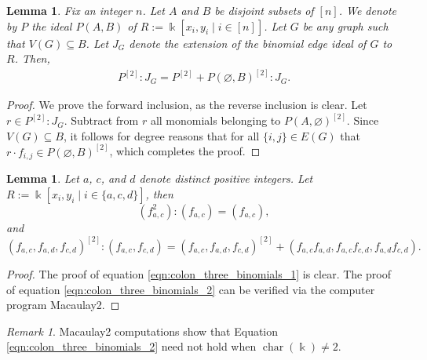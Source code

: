 \documentclass[12pt,a4paper]{amsart}
\theoremstyle{plain}
\newtheorem{lem}[thrm]{Lemma}
\def\blem{\begin{lem}}
\def\elem{\end{lem}}
\theoremstyle{definition}
\def\bproof{\begin{proof}}
\def\eproof{\end{proof}}
\theoremstyle{remark}
\newtheorem{rem}[thrm]{Remark}
\def\brem{\begin{rem}}
\def\erem{\end{rem}}
\def\k{\Bbbk}
\DeclareMathOperator{\fchar}{char}
\renewcommand{\subset}{\subseteq}
\begin{document}
\blem 
\label{lem:reduction_of_colon_computation}
Fix an integer $n$. Let $A$ and $B$ be disjoint subsets of $[n]$. We denote by $P$ the ideal $P(A,B)$ of $R := \k[x_{i},y_{i} \mid i \in [n]]$. Let $G$ be any graph such that $V(G) \subset B$. Let $J_{G}$ denote the extension of the binomial edge ideal of $G$ to $R$. Then,
\begin{align*}
    P^{[2]}:J_{G} = P^{[2]} + P(\varnothing,B)^{[2]}:J_{G}.
\end{align*}
\elem 

\bproof
We prove the forward inclusion, as the reverse inclusion is clear. Let $r \in P^{[2]}:J_{G}$. Subtract from $r$ all monomials belonging to $P(A,\varnothing)^{[2]}$. Since $V(G) \subset B$, it follows for degree reasons that for all $\{i,j\} \in E(G)$ that $r\cdot f_{i,j} \in P(\varnothing,B)^{[2]}$, which completes the proof.
\eproof

\blem
\label{lem:colon_three_binomials}
Let $a$, $c$, and $d$ denote distinct positive integers. Let $R := \k[x_{i},y_{i} \mid i \in \{a,c,d\}]$, then
\begin{equation}
    \label{eqn:colon_three_binomials_1}
    (f_{a,c}^{2}):(f_{a,c}) = (f_{a,c}),
\end{equation}
and 
\begin{equation}
    \label{eqn:colon_three_binomials_2}
    (f_{a,c},f_{a,d},f_{c,d})^{[2]} : (f_{a,c},f_{c,d}) = (f_{a,c},f_{a,d},f_{c,d})^{[2]} + (f_{a,c}f_{a,d}, f_{a,c}f_{c,d}, f_{a,d}f_{c,d}).
\end{equation}
\elem 

\bproof
The proof of equation \eqref{eqn:colon_three_binomials_1} is clear. The proof of equation \eqref{eqn:colon_three_binomials_2} can be verified via the computer program Macaulay2.
\eproof

\brem
Macaulay2 computations show that Equation \eqref{eqn:colon_three_binomials_2} need not hold when $\fchar(\k) \neq 2$.
\erem 
\end{document}
